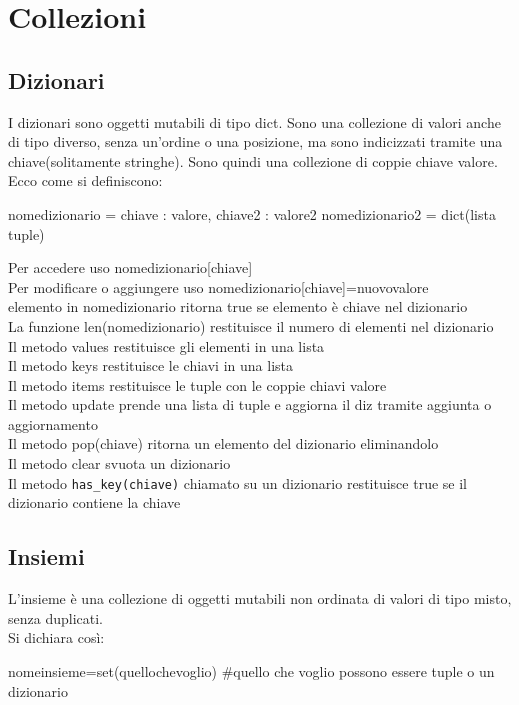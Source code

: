 \chapter{Collezioni}
\section{Dizionari}
I dizionari sono oggetti mutabili di tipo dict. Sono una collezione di valori anche di tipo diverso, senza un'ordine o una posizione, ma sono indicizzati tramite una chiave(solitamente stringhe). Sono quindi una collezione di coppie chiave valore.
Ecco come si definiscono:

\begin{py}
nomedizionario = {chiave : valore, chiave2 : valore2}
nomedizionario2 = dict(lista tuple)
\end{py}

Per accedere uso nomedizionario[chiave]\\
Per modificare o aggiungere uso nomedizionario[chiave]=nuovovalore\\
elemento in nomedizionario ritorna true se elemento è chiave nel dizionario\\
La funzione len(nomedizionario) restituisce il numero di elementi nel dizionario\\
Il metodo values restituisce gli elementi in una lista\\
Il metodo keys restituisce le chiavi in una lista\\
Il metodo items restituisce le tuple con le coppie chiavi valore\\
Il metodo update prende una lista di tuple e aggiorna il diz tramite aggiunta o aggiornamento\\
Il metodo pop(chiave) ritorna un elemento del dizionario eliminandolo\\
Il metodo clear svuota un dizionario\\
Il metodo \verb|has_key(chiave)| chiamato su un dizionario restituisce true se il dizionario contiene la chiave\\

\section{Insiemi}
L'insieme è una collezione di oggetti mutabili non ordinata di valori di tipo misto, senza duplicati.\\
Si dichiara così:

\begin{py}
nomeinsieme=set(quellochevoglio)
#quello che voglio possono essere tuple o un dizionario
\end{py}

